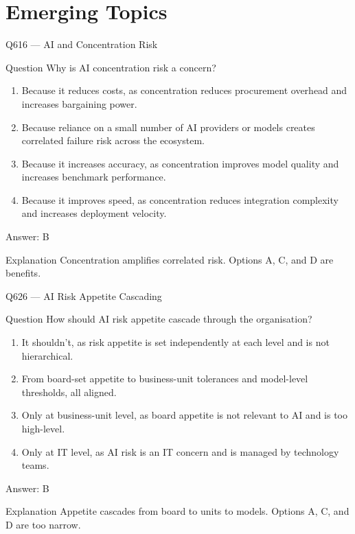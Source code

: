 \documentclass[aspectratio=169,8pt]{beamer}
\begin{document}
	\section{Emerging Topics}
	

	\begin{frame}{Q616 --- AI and Concentration Risk}
		\begin{block}{Question}
			Why is AI concentration risk a concern?
			\begin{enumerate}
				\item Because it reduces costs, as concentration reduces procurement overhead and increases bargaining power.
				\item Because reliance on a small number of AI providers or models creates correlated failure risk across the ecosystem.
				\item Because it increases accuracy, as concentration improves model quality and increases benchmark performance.
				\item Because it improves speed, as concentration reduces integration complexity and increases deployment velocity.
			\end{enumerate}
		\end{block}
		\begin{exampleblock}{Answer: B}\end{exampleblock}
		\begin{block}{Explanation}
			Concentration amplifies correlated risk. Options A, C, and D are benefits.
		\end{block}
	\end{frame}
	
	
	

	
	\begin{frame}{Q626 --- AI Risk Appetite Cascading}
		\begin{block}{Question}
			How should AI risk appetite cascade through the organisation?
			\begin{enumerate}
				\item It shouldn't, as risk appetite is set independently at each level and is not hierarchical.
				\item From board-set appetite to business-unit tolerances and model-level thresholds, all aligned.
				\item Only at business-unit level, as board appetite is not relevant to AI and is too high-level.
				\item Only at IT level, as AI risk is an IT concern and is managed by technology teams.
			\end{enumerate}
		\end{block}
		\begin{exampleblock}{Answer: B}\end{exampleblock}
		\begin{block}{Explanation}
			Appetite cascades from board to units to models. Options A, C, and D are too narrow.
		\end{block}
	\end{frame}
	
\end{document}
